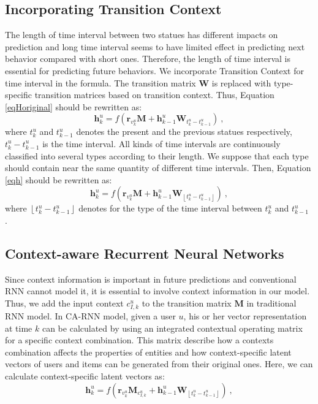 \documentclass[conference]{IEEEtran}
\begin{document}
\subsection{ Incorporating Transition Context}
The length of time interval between two statues has different impacts on prediction and long time interval seems to have limited effect in predicting next behavior compared with short ones. Therefore, the length of time interval is essential for predicting future behaviors. We incorporate Transition Context for time interval in the formula. The transition matrix $\textbf{W}$ is replaced with type-specific transition matrices based on transition context. Thus, Equation \ref{eqHoriginal} should be rewritten as: 
\begin{equation}  \label{eqh}
\textbf{h}_{k}^{u}=f\left ( \textbf{r}_{v_{k}^{u}}\textbf{M}+\textbf{h}_{k-1}^{u}\textbf{W}_{ t_k^u-t_{k-1}^u  }\right )~,
\end{equation}
 where $t_k^u$ and $t_{k-1}^u$ denotes the present and the previous statues respectively, $t_k^u-t_{k-1}^u$ is the time interval.  All kinds of time intervals are continuously classified into several types according to their length. We suppose that each type should contain near the same quantity of different time intervals. Then, Equation \ref{eqh} should be rewritten as: 
\begin{equation}  
\textbf{h}_{k}^{u}=f\left ( \textbf{r}_{v_{k}^{u}}\textbf{M}+\textbf{h}_{k-1}^{u}\textbf{W}_{\left\lfloor t_k^u-t_{k-1}^u \right\rfloor }\right )~,
\end{equation}
where $\left\lfloor t_k^u-t_{k-1}^u \right\rfloor$ denotes for the type of the time interval between $t_k^u$ and $t_{k-1}^u$ .



\subsection{ Context-aware Recurrent Neural Networks}
Since context information is important in future predictions and conventional RNN cannot model it, it is essential to involve context information in our model. Thus, we add the input context $c_{I,k}^{u}$ to the transition matrix $\textbf{M}$ in traditional RNN model. In CA-RNN model, given a user $u$, his or her vector representation at time $k$ can be calculated by using an integrated contextual operating matrix for a specific context combination. This matrix describe how a contexts combination affects the properties of entities and how context-specific latent vectors of users and items can be generated from their original ones. Here, we can calculate context-specific latent vectors as: 
\begin{equation}\label{eqHt}
\textbf{h}_{k}^{u}=f\left ( \textbf{r}_{v_{k}^{u}}\textbf{M}_{c_{I,k}^{u}}+\textbf{h}_{k-1}^{u}\textbf{W}_{\left\lfloor t_k^u-t_{k-1}^u \right\rfloor }\right )~,
\end{equation}
\end{document}
